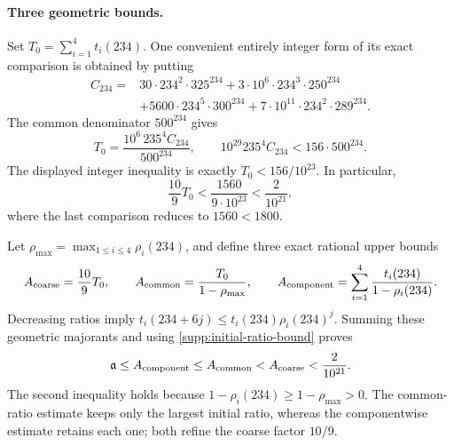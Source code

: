 \paragraph{Three geometric bounds.}
Set $T_0=\sum_{i=1}^4t_i(234)$.  One convenient entirely integer form of
its exact comparison is obtained by putting
\begin{align*}
 C_{234}={}&30\cdot234^2\cdot325^{234}
 +3\cdot10^6\cdot234^3\cdot250^{234}\\
 &+5600\cdot234^5\cdot300^{234}
 +7\cdot10^{11}\cdot234^2\cdot289^{234}.
\end{align*}
The common denominator $500^{234}$ gives
\[
 T_0=\frac{10^6\,235^4 C_{234}}{500^{234}},\qquad
 10^{29}235^4 C_{234}<156\cdot500^{234}.
\]
The displayed integer inequality is exactly
$T_0<156/10^{23}$.  In particular,
\begin{equation}
 \frac{10}{9}T_0<\frac{1560}{9\cdot10^{23}}
       <\frac2{10^{21}},
 \label{supp:first-sum-bound}
\end{equation}
where the last comparison reduces to $1560<1800$.

Let $\rho_{\max}=\max_{1\leq i\leq4}\rho_i(234)$, and define three
exact rational upper bounds
\[
 A_{\rm coarse}=\frac{10}{9}T_0,\qquad
 A_{\rm common}=\frac{T_0}{1-\rho_{\max}},\qquad
 A_{\rm component}=\sum_{i=1}^4
                \frac{t_i(234)}{1-\rho_i(234)}.
\]
Decreasing ratios imply
$t_i(234+6j)\leq t_i(234)\rho_i(234)^j$.  Summing these geometric
majorants and using \eqref{supp:initial-ratio-bound} proves
\begin{equation}
 \mathfrak a\leq A_{\rm component}
 \leq A_{\rm common}<A_{\rm coarse}<\frac2{10^{21}}.
 \label{supp:geometric-bounds}
\end{equation}
The second inequality holds because
$1-\rho_i(234)\geq1-\rho_{\max}>0$.  The common-ratio estimate keeps
only the largest initial ratio, whereas the componentwise estimate retains
each one; both refine the coarse factor $10/9$.

